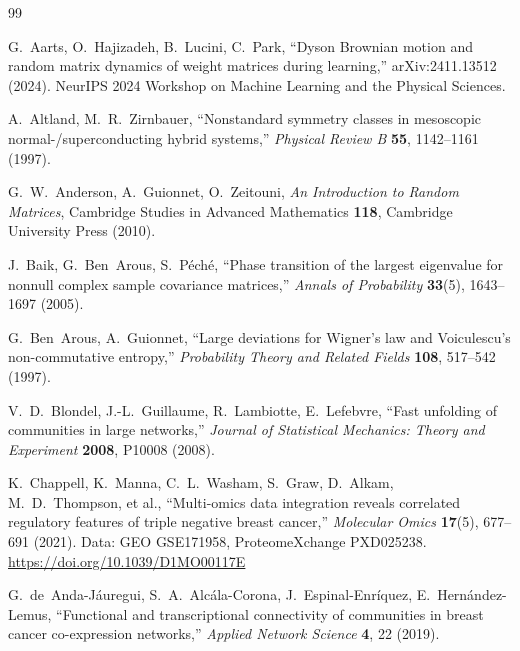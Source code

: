 \documentclass[11pt]{article}
\begin{document}

\begin{thebibliography}{99}

G.~Aarts, O.~Hajizadeh, B.~Lucini, C.~Park,
\newblock ``Dyson Brownian motion and random matrix dynamics of weight matrices during learning,''
\newblock arXiv:2411.13512 (2024). NeurIPS 2024 Workshop on Machine Learning and the Physical Sciences.

A.~Altland, M.~R.~Zirnbauer,
\newblock ``Nonstandard symmetry classes in mesoscopic normal-/superconducting hybrid systems,''
\newblock \emph{Physical Review B} \textbf{55}, 1142--1161 (1997).

G.~W.~Anderson, A.~Guionnet, O.~Zeitouni,
\newblock \emph{An Introduction to Random Matrices},
\newblock Cambridge Studies in Advanced Mathematics \textbf{118}, Cambridge University Press (2010).

J.~Baik, G.~Ben~Arous, S.~P\'ech\'e,
\newblock ``Phase transition of the largest eigenvalue for nonnull complex sample covariance matrices,''
\newblock \emph{Annals of Probability} \textbf{33}(5), 1643--1697 (2005).

G.~Ben~Arous, A.~Guionnet,
\newblock ``Large deviations for Wigner's law and Voiculescu's non-commutative entropy,''
\newblock \emph{Probability Theory and Related Fields} \textbf{108}, 517--542 (1997).

V.~D.~Blondel, J.-L.~Guillaume, R.~Lambiotte, E.~Lefebvre,
\newblock ``Fast unfolding of communities in large networks,''
\newblock \emph{Journal of Statistical Mechanics: Theory and Experiment} \textbf{2008}, P10008 (2008).

K.~Chappell, K.~Manna, C.~L.~Washam, S.~Graw, D.~Alkam, M.~D.~Thompson,
et al.,
\newblock ``Multi-omics data integration reveals correlated regulatory features of triple negative breast cancer,''
\newblock \emph{Molecular Omics} \textbf{17}(5), 677--691 (2021). Data: GEO GSE171958, ProteomeXchange PXD025238.
\newblock \url{https://doi.org/10.1039/D1MO00117E}

G.~de~Anda-J\'auregui, S.~A.~Alc\'ala-Corona, J.~Espinal-Enr\'iquez, E.~Hern\'andez-Lemus,
\newblock ``Functional and transcriptional connectivity of communities in breast cancer co-expression networks,''
\newblock \emph{Applied Network Science} \textbf{4}, 22 (2019).


\end{thebibliography}
\end{document}
